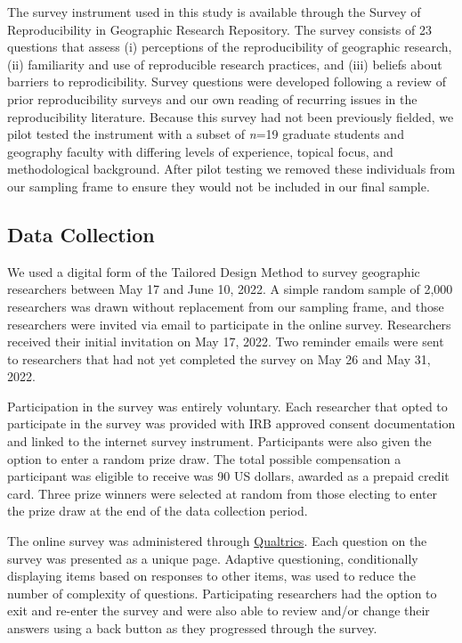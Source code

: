 \documentclass[]{interact}
\theoremstyle{plain}%
\theoremstyle{definition}
\theoremstyle{remark}
\begin{document}
The survey instrument used in this study is available through the Survey of Reproducibility in Geographic Research Repository.
The survey consists of 23 questions that assess (i) perceptions of the reproducibility of geographic research, (ii) familiarity and use of reproducible research practices, and (iii) beliefs about barriers to reprodicibility. 
Survey questions were developed following a review of prior reproducibility surveys \citep[e.g.,][]{fanelli2009many,baker20161, konkol2019} and our own reading of recurring issues in the reproducibility literature. 
Because this survey had not been previously fielded, we pilot tested the instrument with a subset of \textit{n}=19 graduate students and geography faculty with differing levels of experience, topical focus, and methodological background. 
After pilot testing we removed these individuals from our sampling frame to ensure they would not be included in our final sample.

\subsection*{Data Collection}
We used a digital form of the Tailored Design Method \citep{dillman2014internet} to survey geographic researchers between May 17 and June 10, 2022.
A simple random sample of 2,000 researchers was drawn without replacement from our sampling frame, and those researchers were invited via email to participate in the online survey. 
Researchers received their initial invitation on May 17, 2022. 
Two reminder emails were sent to researchers that had not yet completed the survey on May 26 and May 31, 2022.

Participation in the survey was entirely voluntary. 
Each researcher that opted to participate in the survey was provided with IRB approved consent documentation and linked to the internet survey instrument. 
Participants were also given the option to enter a random prize draw. 
The total possible compensation a participant was eligible to receive was 90 US dollars, awarded as a prepaid credit card.
Three prize winners were selected at random from those electing to enter the prize draw at the end of the data collection period.

The online survey was administered through \href{https://www.qualtrics.com/}{Qualtrics}. 
Each question on the survey was presented as a unique page. 
Adaptive questioning, conditionally displaying items based on responses to other items, was used to reduce the number of complexity of questions.
Participating researchers had the option to exit and re-enter the survey and were also able to review and/or change their answers using a back button as they progressed through the survey.
\end{document}
